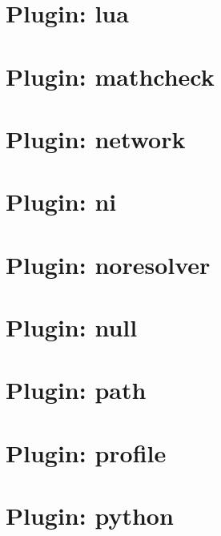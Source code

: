 \documentclass[twoside]{book}
\newcommand{\+}{\discretionary{\mbox{\scriptsize$\hookleftarrow$}}{}{}}
\begin{document}
\chapter{Plugin\+: lua}
\label{md_src_plugins_lua_README}
\hypertarget{md_src_plugins_lua_README}{}

\chapter{Plugin\+: mathcheck}
\label{md_src_plugins_mathcheck_README}
\hypertarget{md_src_plugins_mathcheck_README}{}

\chapter{Plugin\+: network}
\label{md_src_plugins_network_README}
\hypertarget{md_src_plugins_network_README}{}

\chapter{Plugin\+: ni}
\label{md_src_plugins_ni_README}
\hypertarget{md_src_plugins_ni_README}{}

\chapter{Plugin\+: noresolver}
\label{md_src_plugins_noresolver_README}
\hypertarget{md_src_plugins_noresolver_README}{}

\chapter{Plugin\+: null}
\label{md_src_plugins_null_README}
\hypertarget{md_src_plugins_null_README}{}

\chapter{Plugin\+: path}
\label{md_src_plugins_path_README}
\hypertarget{md_src_plugins_path_README}{}

\chapter{Plugin\+: profile}
\label{md_src_plugins_profile_README}
\hypertarget{md_src_plugins_profile_README}{}

\chapter{Plugin\+: python}
\label{md_src_plugins_python_README}
\hypertarget{md_src_plugins_python_README}{}

\end{document}
